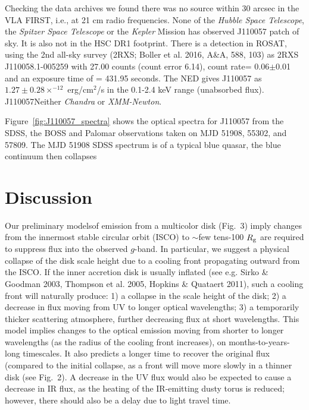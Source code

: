\documentclass{nature}
\begin{document}
Checking the data archives we found there was 
no source within 30 arcsec in the VLA FIRST, i.e., at 21 cm radio frequencies.
None of the {\it Hubble Space Telescope}, the {\it Spitzer Space
Telescope} or the {\it Kepler} Mission has observed J110057 patch of
sky. It is also not in the HSC DR1 footprint.  There is a detection in
ROSAT, using the 2nd all-sky survey (2RXS; Boller et al. 2016, A\&A,
588, 103) as 2RXS J110058.1-005259 with 27.00 counts (count error
6.14), count rate= 0.06$\pm$0.01 and an exposure time of = 431.95
seconds.  The NED gives J110057 as $1.27\pm0.28 \times^{-12}$
erg/cm$^{2}$/s in the 0.1-2.4 keV range (unabsorbed
flux). J110057Neither {\it Chandra} or {\it XMM-Newton}.

Figure~\ref{fig:J110057_spectra} shows the optical spectra for J110057
from the SDSS, the BOSS and Palomar observations taken on MJD 51908,
55302, and 57809. The MJD 51908 SDSS spectrum is of a typical blue quasar, 
the blue continuum then collapses 



\section{Discussion}   %
Our preliminary modelsof emission from a multicolor disk (Fig.~3) 
imply changes from the innermost stable circular orbit (ISCO) to
$\sim$few tens-100 $R_{\rm g}$ are required to suppress flux into the
observed $g$-band. In particular, we suggest a physical collapse of
the disk scale height due to a cooling front propagating outward from
the ISCO. 
If the inner accretion disk is usually inflated (see
e.g. Sirko \& Goodman 2003, Thompson et al. 2005, Hopkins \& Quataert
2011), such a cooling front will naturally produce: 1) a collapse in
the scale height of the disk; 2) a decrease in flux moving from UV to
longer optical wavelengths; 3) a temporarily thicker scattering
atmosphere, further decreasing flux at short wavelengths.  This
model implies changes to the optical emission moving from shorter to
longer wavelengths (as the radius of the cooling front increases), on
months-to-years-long timescales. It also predicts a longer time to
recover the original flux (compared to the initial collapse, as a
front will move more slowly in a thinner disk (see Fig.~2). A decrease
in the UV flux would also be expected to cause a decrease in IR flux,
as the heating of the IR-emitting dusty torus is reduced; however,
there should also be a delay due to light travel time.
\end{document}
